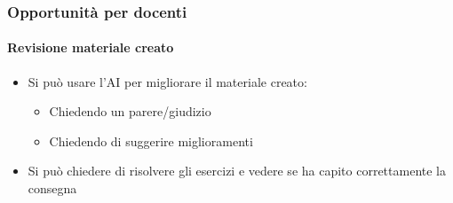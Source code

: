 \begin{contentframe}
    \frametitle{Opportunità per docenti}
    \framesubtitle{Revisione materiale creato}

    \begin{itemize}
        \item Si può usare l'AI per migliorare il materiale creato:
        \begin{itemize}
            \item Chiedendo un parere/giudizio
            \item Chiedendo di suggerire miglioramenti
        \end{itemize}

        \bigskip
        \item Si può chiedere di risolvere gli esercizi e vedere se ha capito correttamente la consegna
    \end{itemize}
\end{contentframe}



        

